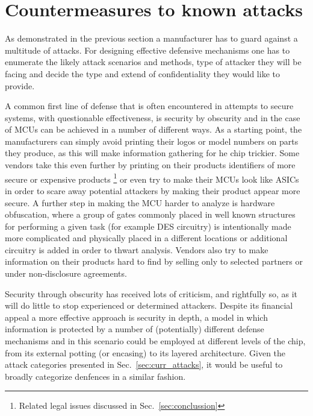 \section{Countermeasures to known attacks}
\label{sec:defenses}

As demonstrated in the previous section a manufacturer has to guard against a multitude of attacks. For designing effective defensive mechanisms one has to enumerate the likely attack scenarios and methods, type of attacker they will be facing and decide the type and extend of confidentiality they would like to provide\citep{sergei:thesis}\citep{kocher:DPA}.

A common first line of defense that is often encountered in attempts to secure systems, with questionable effectiveness, is security by obscurity and in the case of MCUs can be achieved in a number of different ways. As a starting point, the manufacturers can simply avoid printing their logos or model numbers on parts they produce, as this will make information gathering for he chip trickier. Some vendors take this even further by printing on their products identifiers of more secure or expensive products \footnote{Related legal issues discussed in Sec.~\ref{sec:conclussion}} or even try to make their MCUs look like ASICs  in order to scare away potential attackers by making their product appear more secure\citep{sergei:thesis}. A further step in making the MCU harder to analyze is hardware obfuscation, where a group of gates commonly placed in well known structures for performing a given task (for example DES circuitry) is intentionally made more complicated and physically placed in a different locations or additional circuitry is added in order to thwart analysis\citep{anderson:cautionary_note}. Vendors also try to make information on their products hard to find by selling only to selected partners or under non-disclosure agreements\citep{sergei:thesis}.

Security through obscurity has received lots of criticism, and rightfully so, as it will do little to stop experienced or determined attackers. Despite its financial appeal a more effective approach is security in depth, a model in which information is protected by a number of (potentially) different defense mechanisms and in this scenario could be employed at different levels of the chip, from its external potting (or encasing) to its layered architecture. Given the attack categories presented in Sec.~\ref{sec:curr_attacks}, it would be useful to broadly categorize denfences in a similar fashion.

